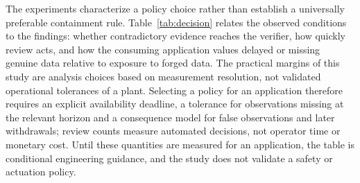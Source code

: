 The experiments characterize a policy choice rather than establish a universally preferable containment rule. Table~\ref{tab:decision} relates the observed conditions to the findings: whether contradictory evidence reaches the verifier, how quickly review acts, and how the consuming application values delayed or missing genuine data relative to exposure to forged data. The practical margins of this study are analysis choices based on measurement resolution, not validated operational tolerances of a plant. Selecting a policy for an application therefore requires an explicit availability deadline, a tolerance for observations missing at the relevant horizon and a consequence model for false observations and later withdrawals; review counts measure automated decisions, not operator time or monetary cost. Until these quantities are measured for an application, the table is conditional engineering guidance, and the study does not validate a safety or actuation policy.

